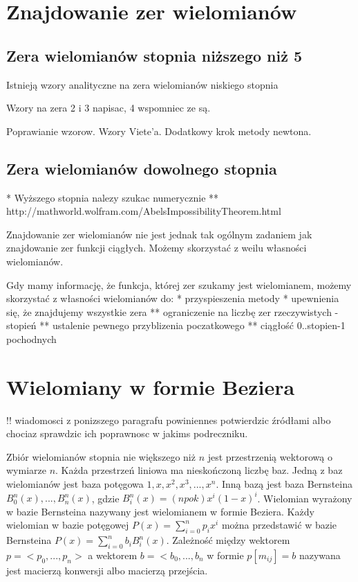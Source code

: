 \documentclass[11pt,a4paper,oneside]{report}
\begin{document}
\section{Znajdowanie zer wielomianów}

\subsection{Zera wielomianów stopnia niższego niż 5}

Istnieją wzory analityczne na zera wielomianów niskiego stopnia

Wzory na zera 2 i 3 napisac, 4 wspomniec ze są.

Poprawianie wzorow. Wzory Viete'a. Dodatkowy krok metody newtona.

\subsection{Zera wielomianów dowolnego stopnia}

* Wyższego stopnia nalezy szukac numerycznie
** http://mathworld.wolfram.com/AbelsImpossibilityTheorem.html

Znajdowanie zer wielomianów nie jest jednak tak ogólnym zadaniem jak znajdowanie zer funkcji ciągłych. Możemy skorzystać z weilu własności wielomianów.

Gdy mamy informację, że funkcja, której zer szukamy jest wielomianem, możemy skorzystać z własności wielomianów do:
* przyspieszenia metody
* upewnienia się, że znajdujemy wszystkie zera
** ograniczenie na liczbę zer rzeczywistych - stopień
** ustalenie pewnego przyblizenia poczatkowego
** ciągłość 0..stopien-1 pochodnych



\section{Wielomiany w formie Beziera}

!! wiadomosci z ponizszego paragrafu powiniennes potwierdzic źródłami albo chociaz sprawdzic ich poprawnosc w jakims podreczniku.

Zbiór wielomianów stopnia nie większego niż $n$ jest przestrzenią wektorową o wymiarze $n$. Każda przestrzeń liniowa ma nieskończoną liczbę baz. Jedną z baz wielomianów jest baza potęgowa ${1,x,x^2,x^3,...,x^n}$. Inną bazą jest baza Bernsteina ${B^n_0(x),...,B^n_n(x)}$, gdzie $B^n_i(x) = (n po k)x^i(1-x)^i$. Wielomian wyrażony w bazie Bernsteina nazywany jest wielomianem w formie Beziera. Każdy wielomian w bazie potęgowej $P(x) = \sum^n_{i=0}p_i x^i$ można przedstawić w bazie Bernsteina $P(x) = \sum^n_{i=0}b_i B^n_i(x)$. Zależność między wektorem $p = <p_0,...,p_n>$ a wektorem $b = <b_0, ..., b_n$ w formie $p [ m_{ij} ] = b$ nazywana jest macierzą konwersji albo macierzą przejścia.
\end{document}
